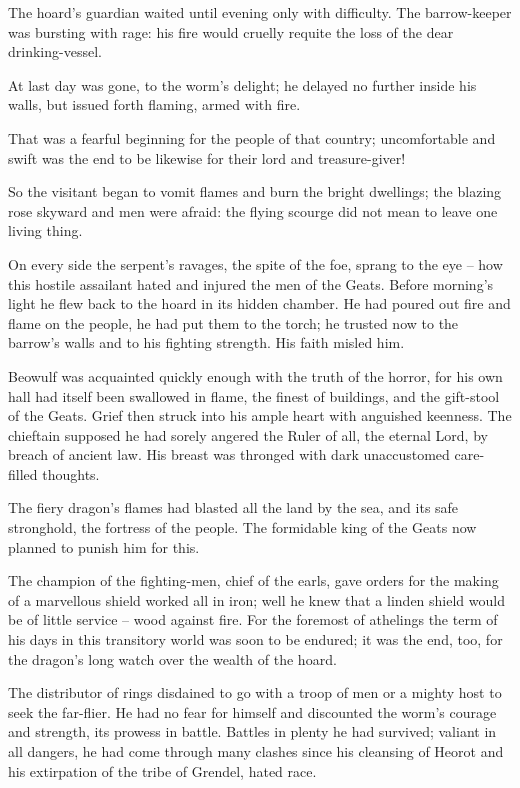 \documentclass[a4paper]{article}
\begin{document}
{The hoard’s guardian
waited until evening only with difficulty.
The barrow-keeper was bursting with rage:
his fire would cruelly requite the loss
of the dear drinking-vessel.

At last day was gone,
to the worm’s delight; he delayed no further
inside his walls, but issued forth flaming,
armed with fire.

That was a fearful beginning
for the people of that country; uncomfortable and swift
was the end to be likewise for their lord and treasure-giver!

So the visitant began to vomit flames
and burn the bright dwellings; the blazing rose skyward
and men were afraid: the flying scourge
did not mean to leave one living thing.

On every side the serpent’s ravages,
the spite of the foe, sprang to the eye –
how this hostile assailant hated and injured
the men of the Geats. Before morning’s light
he flew back to the hoard in its hidden chamber.
He had poured out fire and flame on the people,
he had put them to the torch; he trusted now to the barrow’s walls
and to his fighting strength. His faith misled him.

Beowulf was acquainted quickly enough
with the truth of the horror, for his own hall had itself
been swallowed in flame, the finest of buildings,
and the gift-stool of the Geats. Grief then struck
into his ample heart with anguished keenness.
The chieftain supposed he had sorely angered
the Ruler of all, the eternal Lord,
by breach of ancient law. His breast was thronged
with dark unaccustomed care-filled thoughts.

The fiery dragon’s flames had blasted
all the land by the sea, and its safe stronghold,
the fortress of the people. The formidable king
of the Geats now planned to punish him for this.

The champion of the fighting-men, chief of the earls,
gave orders for the making of a marvellous shield
worked all in iron; well he knew
that a linden shield would be of little service
– wood against fire. For the foremost of athelings
the term of his days in this transitory world
was soon to be endured; it was the end, too, for the dragon’s
long watch over the wealth of the hoard.

The distributor of rings disdained to go
with a troop of men or a mighty host
to seek the far-flier. He had no fear for himself
and discounted the worm’s courage and strength,
its prowess in battle. Battles in plenty
he had survived; valiant in all dangers,
he had come through many clashes since his cleansing of Heorot
and his extirpation of the tribe of Grendel, hated race.

}
\end{document}
